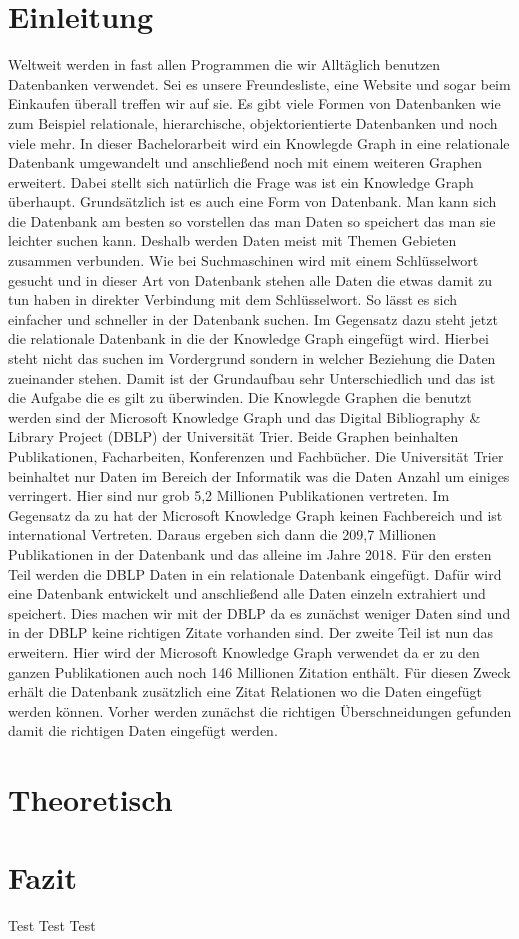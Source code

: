 \documentclass[a4paper,12pt]{article}
\begin{document}
	\tableofcontents
	\section{Einleitung}
	Weltweit werden in fast allen Programmen die wir Alltäglich benutzen Datenbanken verwendet. Sei es unsere Freundesliste, eine Website und sogar beim Einkaufen überall treffen wir auf sie. Es gibt viele Formen von Datenbanken wie  zum Beispiel relationale, hierarchische, objektorientierte Datenbanken und noch viele mehr. In dieser Bachelorarbeit wird ein Knowlegde Graph in eine relationale Datenbank umgewandelt und anschließend noch mit einem weiteren Graphen erweitert. Dabei stellt sich natürlich die Frage was ist ein Knowledge Graph überhaupt. Grundsätzlich ist es auch eine Form von Datenbank. Man kann sich die Datenbank am besten so vorstellen das man Daten so speichert das man sie leichter suchen kann. Deshalb werden Daten meist mit Themen Gebieten zusammen verbunden. Wie bei Suchmaschinen wird mit einem Schlüsselwort gesucht und in dieser Art von Datenbank stehen alle Daten die etwas damit zu tun haben in direkter Verbindung mit dem Schlüsselwort. So lässt es sich einfacher und schneller in der Datenbank suchen. Im Gegensatz dazu steht jetzt die relationale Datenbank in die der Knowledge Graph eingefügt wird. Hierbei steht nicht das suchen im Vordergrund sondern in welcher Beziehung die Daten zueinander stehen. Damit ist der Grundaufbau sehr Unterschiedlich und das ist die Aufgabe die es gilt zu überwinden. Die Knowlegde Graphen die benutzt werden sind der Microsoft Knowledge Graph und das Digital Bibliography \& Library Project (DBLP) der Universität Trier. Beide Graphen beinhalten Publikationen, Facharbeiten, Konferenzen und Fachbücher. Die Universität Trier beinhaltet nur Daten im Bereich der Informatik was die Daten Anzahl um einiges verringert. Hier sind nur grob 5,2 Millionen Publikationen vertreten. Im Gegensatz da zu hat der Microsoft Knowledge Graph keinen Fachbereich und ist international Vertreten. Daraus ergeben sich dann die 209,7 Millionen Publikationen in der Datenbank und das alleine im Jahre 2018. Für den ersten Teil werden die DBLP Daten in ein relationale Datenbank eingefügt. Dafür wird eine Datenbank entwickelt und anschließend alle Daten einzeln extrahiert und speichert. Dies machen wir mit der DBLP da es zunächst weniger Daten sind und in der DBLP keine richtigen Zitate vorhanden sind. Der zweite Teil ist nun das erweitern. Hier wird der Microsoft Knowledge Graph verwendet da er zu den ganzen Publikationen auch noch 146 Millionen Zitation enthält. Für diesen Zweck erhält die Datenbank zusätzlich eine Zitat Relationen wo die Daten eingefügt werden können. Vorher werden zunächst die richtigen Überschneidungen gefunden damit die richtigen Daten eingefügt werden.
	
	\section{Theoretisch}
	\section{Fazit}
	\appendix
	Test Test Test
\end{document}

